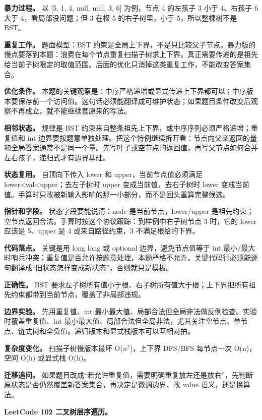 \textbf{暴力过程。} 以 [5, 1, 4, null, null, 3, 6] 为例，节点 4 的左孩子 3 小于 4、右孩子 6 大于 4，看局部没问题；但 3 在根 5 的右子树里，小于 5，所以整棵树不是 BST。

\textbf{重复工作。} 题面模型：BST 约束是全局上下界，不是只比较父子节点。暴力版的慢点要落到本题：浪费在每个节点重复扫描子树求上下界。真正需要传递的是祖先给当前子树限定的取值范围。后面的优化只消掉这类重复工作，不能改变答案集合。

\textbf{优化条件。} 本题的关键观察是：中序严格递增或显式传递上下界都可以；中序版本要保存前一个访问值。这句话必须能翻译成可维护状态；如果题目条件改变后观察不再成立，就不能继续套原来的写法。

\textbf{相邻状态。} 规律是 BST 约束来自整条祖先上下界，或中序序列必须严格递增；重复值和 int 边界要按题意单独处理。把这个特例继续拆开看：节点向父亲返回的量和全局答案通常不是同一个量。先写叶子或空节点的返回值，再写父节点如何合并左右孩子，递归式才有边界基础。

\textbf{状态复用。} 自顶向下传入 lower 和 upper，当前节点值必须满足 lower<val<upper；去左子树时 upper 变成当前值，去右子树时 lower 变成当前值。手算时只改被新输入影响的那一小部分，而不是回头重算完整候选。

\textbf{指针和字段。} 状态字段要能说清：node 是当前节点，lower/upper 是祖先约束；空节点返回合法。手算时按这个协议跟踪：到样例中右子树节点 3 时，它的 lower 应该是 5、upper 是 4 或来自路径约束，3 不满足根给的下界。

\textbf{代码落点。} 关键是用 long long 或 optional 边界，避免节点值等于 int 最小/最大时哨兵冲突；重复值是否允许按题意处理，本题严格不允许。关键代码行必须能逐句翻译成“旧状态怎样变成新状态”，否则就只是模板。

\textbf{正确性。} BST 要求左子树所有值小于根、右子树所有值大于根；上下界把所有祖先约束都带到当前节点，覆盖了非局部违规。

\textbf{边界实验。} 先用重复值、int 最小最大值、局部合法但全局非法做反例检查。实验时覆盖重复值、int 最小最大值、局部合法但全局非法，尤其关注空节点、单节点、链式树和全负值。递归版本和显式栈版本可以互相对拍。

\textbf{复杂度变化。} 扫描子树慢版本最坏 O(\ensuremath{n^{2}})，上下界 DFS/BFS 每节点一次 O(n)，空间 O(h) 或显式栈 O(h)。

\textbf{迁移追问。} 如果题目改成“若允许重复值，需要明确重复放左还是放右”，先判断原状态是否仍然覆盖新答案集合，再决定是微调边界、改 value 语义，还是换算法。

\noindent\textbf{LeetCode 102 二叉树层序遍历。}

